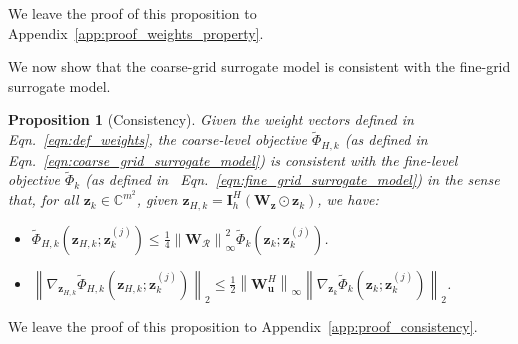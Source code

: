 \documentclass{article}
\numberwithin{equation}{section}
\newtheorem{proposition}[theorem]{Proposition}
\begin{document}
We leave the proof of this proposition to Appendix~\ref{app:proof_weights_property}.

We now show that the coarse-grid surrogate model is consistent with the fine-grid surrogate model. 
\begin{proposition}[Consistency]\label{prop:consistency}
Given the weight vectors defined in~ Eqn.~\eqref{eqn:def_weights}, the coarse-level objective $\widetilde{\Phi}_{H,k}$ (as defined in~ Eqn.~\eqref{eqn:coarse_grid_surrogate_model}) is consistent with the fine-level objective $\widetilde{\Phi}_k$ (as defined in~ Eqn.~\eqref{eqn:fine_grid_surrogate_model}) in the sense that, for all $\bm{z}_k\in\mathbb{C}^{m^2}$, given $\bm{z}_{H,k}=\bm{I}_h^H\left(\bm{W}_{\bm{z}}\odot\bm{z}_{k}\right)$, we have:
\begin{itemize}
    \item $\widetilde{\Phi}_{H,k}\left(\bm{z}_{H,k}; \bm{z}_k^{(j)}\right)\leq \frac{1}{4}\left\|\bm{W}_{\mathcal{R}}\right\|_{\infty}^2\widetilde{\Phi}_k\left(\bm{z}_k; \bm{z}_k^{(j)}\right)$.
    \item $\left\|\nabla_{\bm{z}_{H,k}}\widetilde{\Phi}_{H,k}\left(\bm{z}_{H,k}; \bm{z}_k^{(j)}\right)\right\|_2 \leq \frac{1}{2}\left\|\bm{W}_{\bm{u}}^H\right\|_{\infty} \left\|\nabla_{\bm{z}_k}\widetilde{\Phi}_k\left(\bm{z}_k; \bm{z}_k^{(j)}\right)\right\|_2$.
\end{itemize}
\end{proposition}
We leave the proof of this proposition to Appendix~\ref{app:proof_consistency}. 
\end{document}
